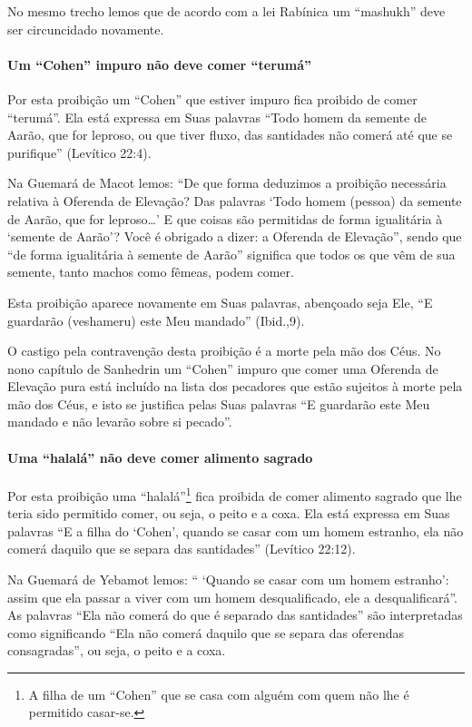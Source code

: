 No mesmo trecho lemos que de acordo com a lei Rabínica um ``mashukh''
deve ser circuncidado novamente.

\paragraph{Um ``Cohen'' impuro não deve comer ``terumá''}

Por esta proibição um ``Cohen'' que estiver impuro fica proibido de
comer ``terumá''. Ela está expressa em Suas palavras ``Todo homem da
semente de Aarão, que for leproso, ou que tiver fluxo, das santidades
não comerá até que se purifique'' (Levítico 22:4).

Na Guemará de Macot lemos: ``De que forma deduzimos a proibição
necessária relativa à Oferenda de Elevação? Das palavras `Todo homem
(pessoa) da semente de Aarão, que for leproso\ldots{}' E que coisas são
permitidas de forma igualitária à `semente de Aarão'? Você é obrigado a
dizer: a Oferenda de Elevação'', sendo que ``de forma igualitária à
semente de Aarão'' significa que todos os que vêm de sua semente, tanto
machos como fêmeas, podem comer.

Esta proibição aparece novamente em Suas palavras, abençoado seja Ele,
``E guardarão (veshameru) este Meu mandado'' (Ibid.,9).

O castigo pela contravenção desta proibição é a morte pela mão dos Céus.
No nono capítulo de Sanhedrin um ``Cohen'' impuro que comer uma Oferenda
de Elevação pura está incluído na lista dos pecadores que estão sujeitos
à morte pela mão dos Céus, e isto se justifica pelas Suas palavras ``E
guardarão este Meu mandado e não levarão sobre si pecado''.

\paragraph{Uma ``halalá'' não deve comer alimento sagrado}

Por esta proibição uma ``halalá''\footnote{A filha de um ``Cohen'' que se casa com alguém com quem não lhe é
  permitido casar-se.} fica proibida de
comer alimento sagrado que lhe teria sido permitido comer, ou seja, o
peito e a coxa. Ela está expressa em Suas palavras ``E a filha do
`Cohen', quando se casar com um homem estranho, ela não comerá daquilo
que se separa das santidades'' (Levítico 22:12).

Na Guemará de Yebamot lemos: `` `Quando se casar com um homem estranho':
assim que ela passar a viver com um homem desqualificado, ele a
desqualificará''. As palavras ``Ela não comerá do que é separado das
santidades'' são interpretadas como significando ``Ela não comerá
daquilo que se separa das oferendas consagradas'', ou seja, o peito e a
coxa.

